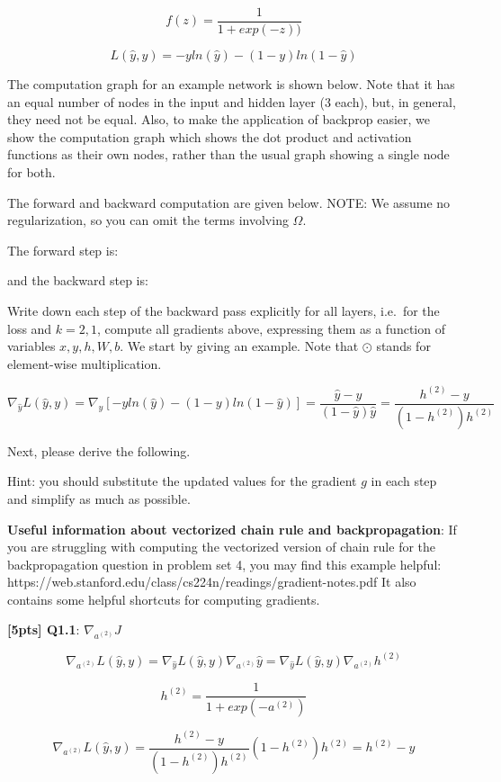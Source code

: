 \documentclass[11pt]{article}
\begin{document}
\[ f(z)=\frac{1}{1+exp(-z))} \]

\[ L(\hat{y},y)=-yln(\hat{y}) - (1-y)ln(1-\hat{y}) \]

The computation graph for an example network is shown below. Note that
it has an equal number of nodes in the input and hidden layer (3 each),
but, in general, they need not be equal. Also, to make the application
of backprop easier, we show the computation graph which shows the dot
product and activation functions as their own nodes, rather than the
usual graph showing a single node for both.

The forward and backward computation are given below. NOTE: We assume no
regularization, so you can omit the terms involving \(\Omega\).

The forward step is:

and the backward step is:

    Write down each step of the backward pass explicitly for all layers,
i.e.~for the loss and \(k=2,1\), compute all gradients above, expressing
them as a function of variables \(x, y, h, W, b\). We start by giving an
example. Note that \(\odot\) stands for element-wise multiplication.

\[ \nabla_{\hat{y}}L(\hat{y},y) =  \nabla_{\hat{y}}[-yln(\hat{y}) - (1-y)ln(1-\hat{y})] = \frac{\hat{y}-y}{(1-\hat{y})\hat{y}} = \frac{h^{(2)}-y}{(1-h^{(2)})h^{(2)}}\]

Next, please derive the following.

Hint: you should substitute the updated values for the gradient \(g\) in
each step and simplify as much as possible.

\textbf{Useful information about vectorized chain rule and
backpropagation}: If you are struggling with computing the vectorized
version of chain rule for the backpropagation question in problem set 4,
you may find this example helpful:
https://web.stanford.edu/class/cs224n/readings/gradient-notes.pdf It
also contains some helpful shortcuts for computing gradients.

    \textbf{{[}5pts{]} Q1.1}: \(\nabla_{a^{(2)}}J\)

    \[ \nabla_{a^{(2)}}L(\hat y, y) 
= \nabla_{\hat{y}}L(\hat{y},y) \nabla_{a^{(2)}} \hat y 
= \nabla_{\hat{y}}L(\hat{y},y) \nabla_{a^{(2)}} h^{(2)}
\]

\[ h^{(2)} = \frac{1}{1+exp(-a^{(2)})} \]

\[ \nabla_{a^{(2)}}L(\hat y, y) = \frac{h^{(2)}-y}{(1-h^{(2)})h^{(2)}}  (1-h^{(2)})h^{(2)} = h^{(2)} - y \]
\end{document}
